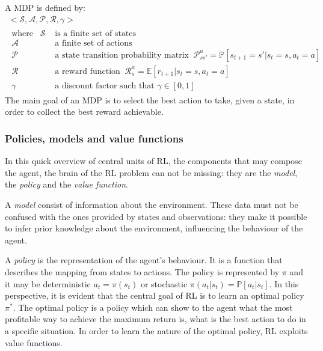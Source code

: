 A MDP is defined by:
\begin{equation}\label{eq:mdp}
	\begin{gathered}
		<\mathcal{S}, \mathcal{A}, \mathcal{P}, \mathcal{R}, \gamma>\\
		\begin{aligned}
			\text{where}\hspace{10pt} \mathcal{S} & \text{ is a finite set of states}                     \\
			\mathcal{A}                           & \text{ a finite set of actions}                       \\
			\mathcal{P}                           & \text{ a state transition probability matrix}\;\;
			\mathcal{P}_{ss'}^a = \mathbb{P}[s_{t+1}= s' | s_t = s, a_t = a]                              \\
			\mathcal{R}                           & \text{ a reward function}
			\;\; \mathcal{R}_{s}^a = \mathbb{E}[r_{t+1} | s_t = s, a_t = a]                               \\
			\gamma                                & \text{ a discount factor such that } \gamma \in [0,1]
		\end{aligned}
	\end{gathered}
\end{equation}
The main goal of an MDP is to select the best action to take, given a state, in order to collect the best reward achievable.

\subsubsection{Policies, models and value functions} \label{pmvf}
In this quick overview of central units of RL, the components that may compose the agent, the brain of the RL problem can not be missing: they are the \textit{model}, the \textit{policy} and the \textit{value function}.

A \textit{model} consist of information about the environment. These data must not be confused with the ones provided by states and observations: they make it possible to infer prior knowledge about the environment, influencing the behaviour of the agent.

A \textit{policy} is the representation of the agent's behaviour. It is a function that describes the mapping from states to actions.  The policy is represented by $\pi$ and it may be deterministic  $a_t = \pi(s_t)$  or stochastic $\pi(a_t|s_t) = \mathbb{P}[a_t | s_t]$.
In this perspective, it is evident that the central goal of RL is to learn an optimal policy $\pi^*$. The optimal policy is a policy which can show to the agent what the most profitable way to achieve the maximum return is, what is the best action to do in a specific situation. In order to learn the nature of the optimal policy, RL exploits value functions.

